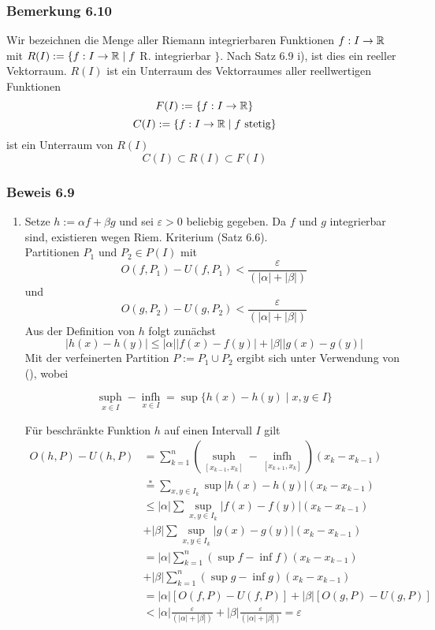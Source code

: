 \subsubsection*{Bemerkung 6.10}
Wir bezeichnen die Menge aller Riemann integrierbaren Funktionen $f:I\to \mathbb{R}$ mit $R(I):=\{f:I\to\mathbb{R}\mid f$ R. integrierbar $\}$. Nach Satz 6.9 i), ist dies ein reeller Vektorraum. $R(I)$ ist ein Unterraum des Vektorraumes aller reellwertigen Funktionen \[F(I):=\{ f:I\to \mathbb{R}\}\]
\[C(I):=\{ f:I\to\mathbb{R}\mid f \text{ stetig}\}\]
ist ein Unterraum von $R(I)$ \[C(I)\subset R(I)\subset F(I)\]
\subsubsection*{Beweis 6.9}
\begin{enumerate}
\item Setze $h:=\alpha f + \beta g$ und sei $\varepsilon>0$ beliebig gegeben. Da $f$ und $g$ integrierbar sind, existieren wegen Riem. Kriterium (Satz 6.6).\\ Partitionen $P_1$ und $P_2 \in P(I)$ mit \[O(f,{P_1}) - U(f,{P_1}) < \frac{\varepsilon }{{(\left| \alpha  \right| + \left| \beta  \right|)}}\] und  \[O(g,{P_2}) - U(g,{P_2}) < \frac{\varepsilon }{{(\left| \alpha  \right| + \left| \beta  \right|)}}\] Aus der Definition von $h$ folgt zunächst \[\left| {h(x) - h(y)} \right| \le \left| \alpha  \right|\left| {f(x) - f(y)} \right| + \left| \beta  \right|\left| {g(x) - g(y)} \right|\] Mit der verfeinerten Partition $P:=P_1\cup P_2$ ergibt sich unter Verwendung von (\textasteriskcentered), wobei


\[
\mathop {\sup h(x)}\limits_{x \in I}  - \mathop {\inf h(x)}\limits_{x \in I}  = \sup \{ h(x) - h(y)\mid x,y \in I\}\tag{\textasteriskcentered}
\]

Für beschränkte Funktion $h$ auf einen Intervall $I$ gilt
\begin{align*}
O(h,P) - U(h,P)&=\sum\limits_{k = 1}^n {(\mathop {\sup h}\limits_{[{x_{k - 1}},{x_k}]}  - \mathop {\inf h}\limits_{[{x_{k + 1}},{x_k}]} )({x_k} - {x_{k - 1}})} \\
&\mathop  =\limits^ *  \sum\limits_{x,y \in {I_k}} {\sup \left| {h(x) - h(y)} \right|({x_k} - {x_{k - 1}})}\\
&\le \left| \alpha  \right|\sum {\mathop {\sup }\limits_{x,y \in {I_k}} \left| {f(x) - f(y)} \right|({x_k} - {x_{k - 1}})}\\
&+ \left| \beta  \right|\sum {\mathop {\sup }\limits_{x,y \in {I_k}} \left| {g(x) - g(y)} \right|({x_k} - {x_{k - 1}})} \\
&= \left| \alpha  \right|\sum\limits_{k = 1}^n {(\sup f - \inf f)({x_k} - {x_{k - 1}})} \\
&+ \left| \beta  \right|\sum\limits_{k = 1}^n {(\sup g - \inf g)({x_k} - {x_{k - 1}})} \\
&=\left| \alpha  \right|[O(f,P) - U(f,P)] + \left| \beta  \right|[O(g,P) - U(g,P)]\\
&< \left| \alpha  \right|\frac{\varepsilon }{{(\left| \alpha  \right| + \left| \beta  \right|)}} + \left| \beta  \right|\frac{\varepsilon }{{(\left| \alpha  \right| + \left| \beta  \right|)}} = \varepsilon
\end{align*}


\end{enumerate}

